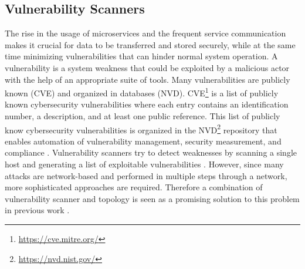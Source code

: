 \subsection{Vulnerability Scanners}
\label{chap:vulnerability_scanners}

The rise in the usage of microservices and the frequent service communication makes it crucial for data to be transferred and stored securely, while at the same time minimizing vulnerabilities that can hinder normal system operation. A vulnerability is a system weakness that could be exploited by a malicious actor with the help of an appropriate suite of tools. Many vulnerabilities are publicly known (CVE) and organized in databases (NVD). CVE\footnote{\url{https://cve.mitre.org/}} is a list of publicly known cybersecurity vulnerabilities where each entry contains an identification number, a description, and at least one public reference. This list of publicly know cybersecurity vulnerabilities is organized in the  NVD\footnote{\url{https://nvd.nist.gov/}} repository that enables automation of vulnerability management, security measurement, and compliance \cite{booth2013national}. Vulnerability scanners try to detect weaknesses by scanning a single host and generating a list of exploitable vulnerabilities \cite{deraison1999nessus, farmer1990cops, clair}. However, since many attacks are network-based and performed in multiple steps through a network, more sophisticated approaches are required. Therefore a combination of vulnerability scanner and topology is seen as a promising solution to this problem in previous work \cite{sheyner2002automated, ingols2006practical}.
